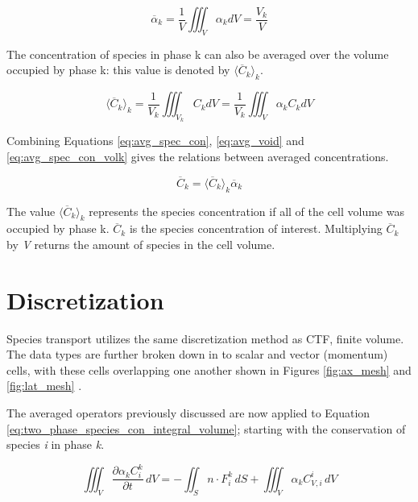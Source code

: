 \begin{equation}
    \overline{\alpha}_{k} = \frac{1}{V}\iiint_{V}\alpha_{k}dV = \frac{V_{k}}{V}
    \label{eq:avg_void}
\end{equation}

The concentration of species in phase k can also be averaged over the volume occupied by phase k: this value is denoted by $\langle \overline{C}_{k} \rangle_{k}$. 

\begin{equation}
    \langle \overline{C}_{k} \rangle_{k} = \frac{1}{V_{k}}\iiint_{V_{k}}C_{k}dV = \frac{1}{V_{k}}\iiint_{V}\alpha_{k}C_{k}dV
    \label{eq:avg_spec_con_volk}
\end{equation}

Combining Equations \ref{eq:avg_spec_con}, \ref{eq:avg_void} and \ref{eq:avg_spec_con_volk} gives the relations between averaged concentrations.

\begin{equation}
    \overline{C}_{k} = \langle \overline{C}_{k} \rangle_{k}\overline{\alpha}_{k}
\end{equation}

The value $\langle \overline{C}_{k} \rangle_{k}$ represents the species concentration if all of the cell volume was occupied by phase k. $\overline{C}_{k}$ is the species concentration of interest. Multiplying $\overline{C}_{k}$ by \textit{V} returns the amount of species in the cell volume. 

\section{Discretization}

Species transport utilizes the same discretization method as CTF, finite volume. The data types are further broken down in to scalar and vector (momentum) cells, with these cells overlapping one another shown in Figures \ref{fig:ax_mesh} and \ref{fig:lat_mesh} \cite{salko2017}. 

The averaged operators previously discussed are now applied to Equation \ref{eq:two_phase_species_con_integral_volume}; starting with the conservation of species \textit{i} in phase \textit{k}. 

\begin{equation}
	\iiint_{V} \frac{\partial \alpha_{k}C^{k}_{i} }{\partial t}\,dV = -\iint_S n \cdot F^{k}_{i} \,dS + \iiint_V \alpha_{k}C_{V,i}^{i} \,dV
	\label{eq:start_eq_of_discretization}
\end{equation}
\FloatBarrier
\newpage


